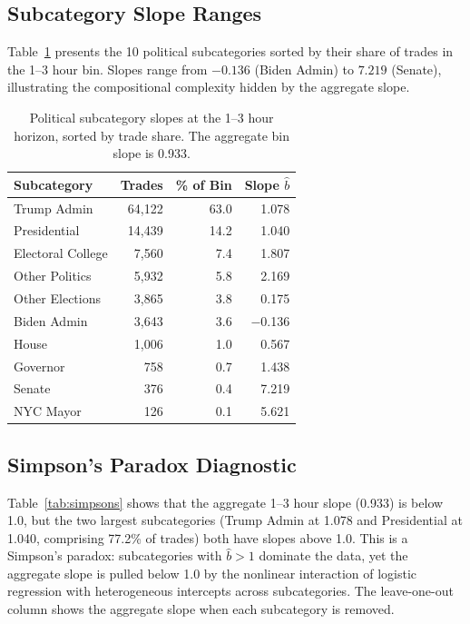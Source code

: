 \documentclass[11pt,a4paper]{article}
\begin{document}
\subsection{Subcategory Slope Ranges}

Table~\ref{tab:subcat_slopes} presents the 10 political subcategories sorted by their share of trades in the 1--3 hour bin. Slopes range from $-0.136$ (Biden Admin) to $7.219$ (Senate), illustrating the compositional complexity hidden by the aggregate slope.

\begin{table}[!ht]
\caption{Political subcategory slopes at the 1--3 hour horizon, sorted by trade share. The aggregate bin slope is 0.933.\label{tab:subcat_slopes}}
\centering
\begin{tabular}{lrrr}
\toprule
Subcategory & Trades & \% of Bin & Slope $\hat{b}$ \\
\midrule
Trump Admin       & 64{,}122 & 63.0 & 1.078 \\
Presidential      & 14{,}439 & 14.2 & 1.040 \\
Electoral College  &  7{,}560 &  7.4 & 1.807 \\
Other Politics     &  5{,}932 &  5.8 & 2.169 \\
Other Elections    &  3{,}865 &  3.8 & 0.175 \\
Biden Admin        &  3{,}643 &  3.6 & $-$0.136 \\
House              &  1{,}006 &  1.0 & 0.567 \\
Governor           &    758   &  0.7 & 1.438 \\
Senate             &    376   &  0.4 & 7.219 \\
NYC Mayor          &    126   &  0.1 & 5.621 \\
\bottomrule
\end{tabular}
\end{table}

\subsection{Simpson's Paradox Diagnostic}

Table~\ref{tab:simpsons} shows that the aggregate 1--3 hour slope (0.933) is below 1.0, but the two largest subcategories (Trump Admin at 1.078 and Presidential at 1.040, comprising 77.2\% of trades) both have slopes above 1.0. This is a Simpson's paradox: subcategories with $\hat{b} > 1$ dominate the data, yet the aggregate slope is pulled below 1.0 by the nonlinear interaction of logistic regression with heterogeneous intercepts across subcategories. The leave-one-out column shows the aggregate slope when each subcategory is removed.
\end{document}
